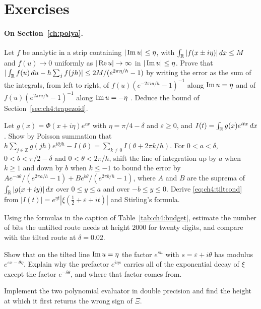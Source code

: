 \section{Exercises}\label{chap:evaluation:ex}

\paragraph{On Section~\ref{ch:polya}.}
\begin{exercises}
\item\label{ex:ch4:trapezoid} Let $f$ be analytic in a strip containing $|\operatorname{Im} u|\le\eta$, with $\int_{\mathbb{R}}|f(x\pm i\eta)|\,dx\le M$ and $f(u)\to0$ uniformly as $|\operatorname{Re} u|\to\infty$ in $|\operatorname{Im} u|\le\eta$. Prove that $|\int_{\mathbb{R}}f(u)\,du-h\sum_jf(jh)|\le2M/(e^{2\pi\eta/h}-1)$ by writing the error as the sum of the integrals, from left to right, of $f(u)(e^{-2\pi iu/h}-1)^{-1}$ along $\operatorname{Im} u=\eta$ and of $f(u)(e^{2\pi iu/h}-1)^{-1}$ along $\operatorname{Im} u=-\eta$ \cite[Theorem 5.1]{TW14}. Deduce the bound of Section~\ref{sec:ch4:trapezoid}.
\item\label{ex:ch4:alias} Let $g(x)=\Phi(x+i\eta)e^{\varepsilon x}$ with $\eta=\pi/4-\delta$ and $\varepsilon\ge0$, and $I(t)=\int_{\mathbb{R}}g(x)e^{itx}\,dx$. Show by Poisson summation that $h\sum_{j\in\mathbb Z}g(jh)e^{i\theta jh}-I(\theta)=\sum_{k\ne0}I(\theta+2\pi k/h)$. For $0<a<\delta$, $0<b<\pi/2-\delta$ and $0<\theta<2\pi/h$, shift the line of integration up by $a$ when $k\ge1$ and down by $b$ when $k\le-1$ to bound the error by $Ae^{-a\theta}/(e^{2\pi a/h}-1)+Be^{b\theta}/(e^{2\pi b/h}-1)$, where $A$ and $B$ are the suprema of $\int_{\mathbb{R}}|g(x+iy)|\,dx$ over $0\le y\le a$ and over $-b\le y\le0$. Derive \eqref{eq:ch4:tiltcond} from $|I(t)|=e^{\eta t}|\xi(\tfrac12+\varepsilon+it)|$ and Stirling's formula.
\item Using the formulas in the caption of Table~\ref{tab:ch4:budget}, estimate the number of bits the untilted route needs at height $2000$ for twenty digits, and compare with the tilted route at $\delta=0.02$.
\item Show that on the tilted line $\operatorname{Im} u=\eta$ the factor $e^{su}$ with $s=\varepsilon+i\theta$ has modulus $e^{\varepsilon x-\theta\eta}$. Explain why the prefactor $e^{i\eta s}$ carries all of the exponential decay of $\xi$ except the factor $e^{-\delta\theta}$, and where that factor comes from.
\item\label{ex:ch4:double} Implement the two polynomial evaluator in double precision and find the height at which it first returns the wrong sign of $\Xi$.

\end{exercises}
